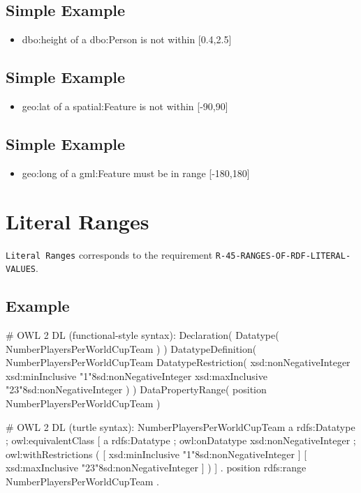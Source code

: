 \documentclass{llncs}
\newcommand{\ms}[1]{\texttt{#1}}
\begin{document}
\subsection{Simple Example}

\begin{itemize}
	\item dbo:height of a dbo:Person is not within [0.4,2.5]
\end{itemize}

\subsection{Simple Example}

\begin{itemize}
	\item geo:lat of a spatial:Feature is not within [-90,90]
\end{itemize}

\subsection{Simple Example}

\begin{itemize}
	\item geo:long of a gml:Feature must be in range [-180,180]
\end{itemize}

\section{Literal Ranges}

\ms{Literal Ranges} corresponds to the requirement
\ms{R-45-RANGES-OF-RDF-LITERAL-} \ms{VALUES}.

\subsection{Example}

\begin{ex}
# OWL 2 DL (functional-style syntax):
Declaration( Datatype( NumberPlayersPerWorldCupTeam ) ) 
DatatypeDefinition( 
    NumberPlayersPerWorldCupTeam
    DatatypeRestriction( 
        xsd:nonNegativeInteger 
        xsd:minInclusive "1"^^xsd:nonNegativeInteger 
        xsd:maxInclusive "23"^^xsd:nonNegativeInteger ) )     
DataPropertyRange( position NumberPlayersPerWorldCupTeam ) 
\end{ex}

\begin{ex}
# OWL 2 DL (turtle syntax):
NumberPlayersPerWorldCupTeam
    a rdfs:Datatype ;
    owl:equivalentClass [
        a rdfs:Datatype ;
        owl:onDatatype xsd:nonNegativeInteger ;
        owl:withRestrictions ( 
            [ xsd:minInclusive "1"^^xsd:nonNegativeInteger ]
            [ xsd:maxInclusive "23"^^xsd:nonNegativeInteger ] ) ] .
position rdfs:range NumberPlayersPerWorldCupTeam .
\end{ex}
\end{document}
